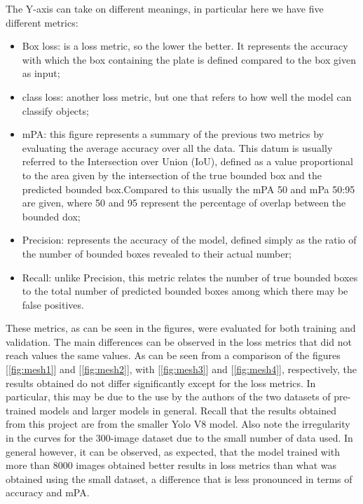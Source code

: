 \documentclass[12pt]{article}
\begin{document}
The Y-axis can take on different meanings, in particular here we have five different metrics:
\begin{itemize}
    \item Box loss: is a loss metric, so the lower the better. It represents the accuracy with which the box containing the plate is defined compared to the box given as input;
    \item class loss: another loss metric, but one that refers to how well the model can classify objects;
    \item mPA: this figure represents a summary of the previous two metrics by evaluating the average accuracy over all the data. This datum is usually referred to the Intersection over Union (IoU), defined as a value proportional to the area given by the intersection of the true bounded box and the predicted bounded box.Compared to this usually the mPA 50 and mPa 50:95 are given, where 50 and 95 represent the percentage of overlap between the bounded dox;
    \item Precision: represents the accuracy of the model, defined simply as the ratio of the number of bounded boxes revealed to their actual number;
    \item Recall: unlike Precision, this metric relates the number of true bounded boxes to the total number of predicted bounded boxes among which there may be false positives.
\end{itemize}

These metrics, as can be seen in the figures, were evaluated for both training and validation. The main differences can be observed in the loss metrics that did not reach values the same values. As can be seen from a comparison of the figures [\ref{fig:mesh1}] and [\ref{fig:mesh2}], with [\ref{fig:mesh3}] and [\ref{fig:mesh4}], respectively, the results obtained do not differ significantly except for the loss metrics. In particular, this may be due to the use by the authors of the two datasets of pre-trained models and larger models in general. Recall that the results obtained from this project are from the smaller Yolo V8 model. Also note the irregularity in the curves for the 300-image dataset due to the small number of data used.
In general however, it can be observed, as expected, that the model trained with more than 8000 images obtained better results in loss metrics than what was obtained using the small dataset, a difference that is less pronounced in terms of accuracy and mPA.

\end{document}

